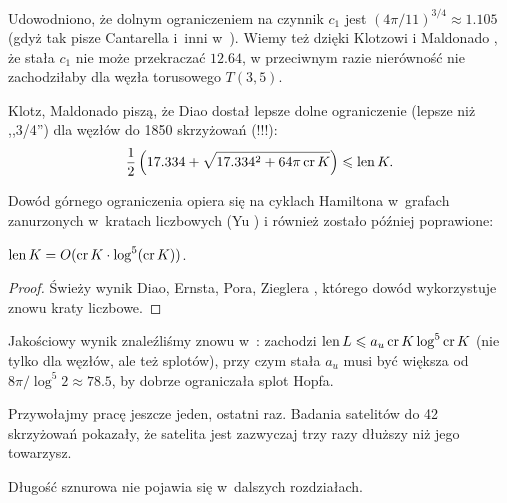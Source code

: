 Udowodniono, że dolnym ograniczeniem na czynnik $c_1$ jest $(4\pi/11)^{3/4} \approx 1.105$ (gdyż tak pisze Cantarella i~inni w~\cite[tw. 23]{cantarella2002}).
Wiemy też dzięki Klotzowi i Maldonado \cite{klotz2021}, że stała $c_1$ nie może przekraczać $12.64$, w przeciwnym razie nierówność nie zachodziłaby dla węzła torusowego $T(3, 5)$.
%
%

Klotz, Maldonado \cite{klotz2021} piszą, że Diao dostał lepsze dolne ograniczenie (lepsze niż ,,3/4'') dla węzłów do 1850 skrzyżowań (!!!):
\begin{equation}
    \frac 12 \left(17.334 + \sqrt{17.334^2 + 64 \pi \operatorname{cr} K}\right) \leqslant \operatorname{len} K.
\end{equation}

Dowód górnego ograniczenia opiera się na cyklach Hamiltona w~grafach zanurzonych w~kratach liczbowych (Yu \cite{yu2004}) i również zostało później poprawione:


\begin{proposition}
    $\operatorname{len} K = O(\operatorname{cr} K \cdot \log^5(\operatorname{cr} K))$.
\end{proposition}

\begin{proof}
    Świeży wynik Diao, Ernsta, Pora, Zieglera \cite{diao2019}, którego dowód wykorzystuje znowu kraty liczbowe.
\end{proof}

Jakościowy wynik znaleźliśmy znowu w~\cite{klotz2021}: zachodzi $\operatorname{len} L \leqslant a_u \operatorname{cr} K \log^5 \operatorname{cr} K$ (nie tylko dla węzłów, ale też splotów), przy czym stała $a_u$ musi być większa od $8\pi/\log^5 2 \approx 78.5$, by dobrze ograniczała splot Hopfa.

Przywołajmy pracę \cite{klotz2021} jeszcze jeden, ostatni raz.
Badania satelitów do 42 skrzyżowań pokazały, że satelita jest zazwyczaj trzy razy dłuższy niż jego towarzysz.

Długość sznurowa nie pojawia się w~dalszych rozdziałach.

%


